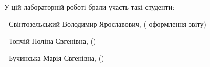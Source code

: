 
У цій лабораторній роботі брали участь такі студенти:

- Свінтозельський Володимир Ярославович, ( оформлення звіту)

- Топчій Поліна Євгенівна, ()

- Бучинська Марія Євгенівна, ()


